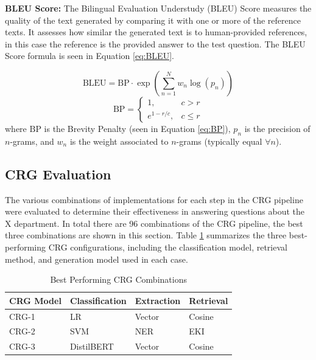 \documentclass[conference]{IEEEtran}
\begin{document}
\noindent
\textbf{BLEU Score:}
The Bilingual Evaluation Understudy (BLEU) Score measures the quality of the text generated by comparing it with one or more of the reference texts.
It assesses how similar the generated text is to human-provided references, in this case the reference is the provided answer to the test question. 
The BLEU Score formula is seen in Equation \ref{eq:BLEU}.

\begin{equation} \label{eq:BLEU}
    \text{BLEU} = \text{BP} \cdot \exp \left( \sum_{n=1}^{N} w_n \log(p_n) \right)
\end{equation}
\begin{equation} \label{eq:BP}
    \text{BP} = 
    \begin{cases}
        1, & c > r \\
        e^{1 - r/c}, & c \leq r
    \end{cases}
\end{equation}
\noindent
where $\text{BP}$ is the Brevity Penalty (seen in Equation \ref{eq:BP}), $p_n$ is the precision of $n$-grams, and $w_n$ is the weight associated to $n$-grams (typically equal $\forall n$).

\subsection{CRG Evaluation}
The various combinations of implementations for each step in the CRG pipeline were evaluated to determine their effectiveness in answering questions about the X department.
In total there are 96 combinations of the CRG pipeline, the best three combinations are shown in this section. 
Table \ref{tab:crg_combinations} summarizes the three best-performing CRG configurations, including the classification model, retrieval method, and generation model used in each case.

\begin{table}[!ht]
    \centering
    \caption{Best Performing CRG Combinations}
    \label{tab:crg_combinations}
    \begin{tabular}{l|l|l|l}
        \toprule
        \textbf{CRG Model} & \textbf{Classification} & \textbf{Extraction} & \textbf{Retrieval} \\
        \midrule
        CRG-1 & LR & Vector & Cosine \\
        CRG-2 & SVM & NER & EKI \\
        CRG-3 & DistilBERT & Vector & Cosine \\
        \bottomrule
    \end{tabular}
\end{table}
\end{document}
